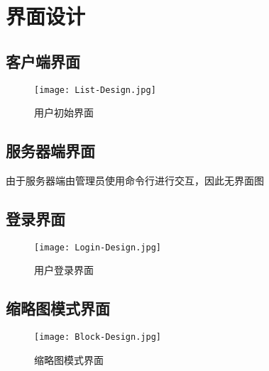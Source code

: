 \chapter{界面设计}
    \section{客户端界面}
        \begin{figure}
            \centering
            \texttt{[image: List-Design.jpg]}
            \caption{用户初始界面}\label{fig:noted-figure}
        \end{figure}

    \section{服务器端界面}
        由于服务器端由管理员使用命令行进行交互，因此无界面图

    \section{登录界面}
        \begin{figure}
            \centering
            \texttt{[image: Login-Design.jpg]}
            \caption{用户登录界面}\label{fig:noted-figure}
        \end{figure}

    \section{缩略图模式界面}
        \begin{figure}
            \centering
            \texttt{[image: Block-Design.jpg]}
            \caption{缩略图模式界面}\label{fig:noted-figure}
        \end{figure}
